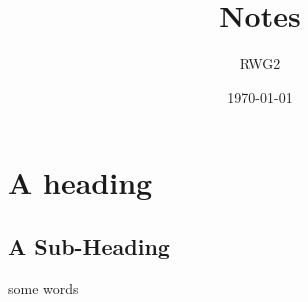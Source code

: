 \documentclass[10pt]{extarticle}\usepackage[letterpaper]{geometry}
\author{RWG2} %
\date{\today}
\title{Notes}
\begin{document}
\tableofcontents
\flushleft

\section{A heading}
\subsection{A Sub-Heading}
some words
\end{document}
